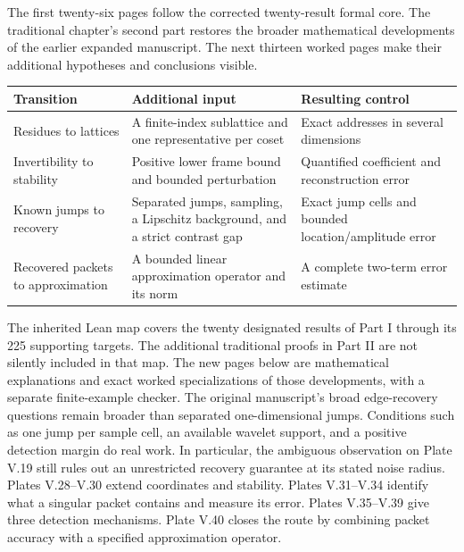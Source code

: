 The first twenty-six pages follow the corrected twenty-result formal core. The traditional chapter's second part restores the broader mathematical developments of the earlier expanded manuscript. The next thirteen worked pages make their additional hypotheses and conclusions visible.
\begin{tabularx}{\linewidth}{@{}>{\raggedright\arraybackslash}p{.21\linewidth}YY@{}}\toprule
Transition & Additional input & Resulting control\\\midrule
Residues to lattices & A finite-index sublattice and one representative per coset & Exact addresses in several dimensions\\
Invertibility to stability & Positive lower frame bound and bounded perturbation & Quantified coefficient and reconstruction error\\
Known jumps to recovery & Separated jumps, sampling, a Lipschitz background, and a strict contrast gap & Exact jump cells and bounded location/amplitude error\\
Recovered packets to approximation & A bounded linear approximation operator and its norm & A complete two-term error estimate\\\bottomrule
\end{tabularx}
The inherited Lean map covers the twenty designated results of Part I through its 225 supporting targets. The additional traditional proofs in Part II are not silently included in that map. The new pages below are mathematical explanations and exact worked specializations of those developments, with a separate finite-example checker.
The original manuscript's broad edge-recovery questions remain broader than separated one-dimensional jumps. Conditions such as one jump per sample cell, an available wavelet support, and a positive detection margin do real work. In particular, the ambiguous observation on Plate V.19 still rules out an unrestricted recovery guarantee at its stated noise radius.
Plates V.28--V.30 extend coordinates and stability. Plates V.31--V.34 identify what a singular packet contains and measure its error. Plates V.35--V.39 give three detection mechanisms. Plate V.40 closes the route by combining packet accuracy with a specified approximation operator.

